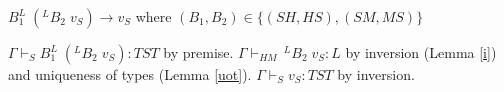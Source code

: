 \begin{case}
$B_{1}^{L}\;(^{L}B_{2}\;v_{S})\rightarrow v_{S}$ where $(B_{1},B_{2})\in\lbrace(SH,HS),(SM,MS)\rbrace$

$\Gamma\vdash_{S}B_{1}^{L}\;(^{L}B_{2}\;v_{S}):TST$ by premise.  $\Gamma\vdash_{HM}\,^{L}B_{2}\;v_{S}:L$ by inversion (Lemma \ref{i}) and uniqueness of types (Lemma \ref{uot}).  $\Gamma\vdash_{S}v_{S}:TST$ by inversion.
\end{case}